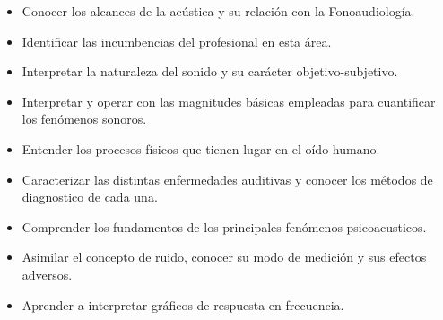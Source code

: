 \begin{itemize}
	\item Conocer los alcances de la acústica y su relación con la Fonoaudiología.
	\item Identificar las incumbencias del profesional en esta área.
	\item Interpretar la naturaleza del sonido y su carácter objetivo-subjetivo.
	\item Interpretar y operar con las magnitudes básicas empleadas para cuantificar los fenómenos sonoros.
	\item Entender los procesos físicos que tienen lugar en el oído humano.
        \item Caracterizar las distintas enfermedades auditivas y conocer los métodos de diagnostico de cada una.
        \item Comprender los fundamentos de los principales fenómenos psicoacusticos.
        \item Asimilar el concepto de ruido, conocer su modo de medición y sus efectos adversos.
        \item Aprender a interpretar gráficos de respuesta en frecuencia.

\end{itemize}

